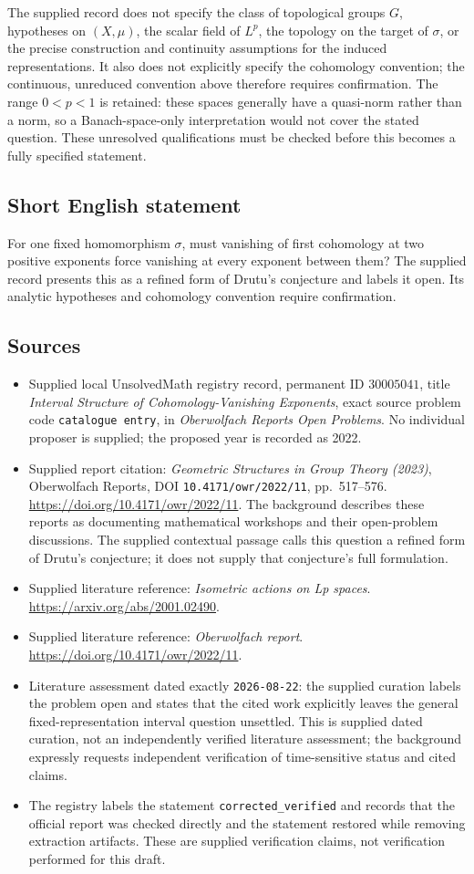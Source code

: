 \documentclass[11pt]{article}
\begin{document}
The supplied record does not specify the class of topological groups \(G\), hypotheses on \((X,\mu)\), the scalar field of \(L^p\), the topology on the target of \(\sigma\), or the precise construction and continuity assumptions for the induced representations. It also does not explicitly specify the cohomology convention; the continuous, unreduced convention above therefore requires confirmation. The range \(0<p<1\) is retained: these spaces generally have a quasi-norm rather than a norm, so a Banach-space-only interpretation would not cover the stated question. These unresolved qualifications must be checked before this becomes a fully specified statement.
\subsection{Short English statement}
For one fixed homomorphism \(\sigma\), must vanishing of first cohomology at two positive exponents force vanishing at every exponent between them? The supplied record presents this as a refined form of Drutu's conjecture and labels it open. Its analytic hypotheses and cohomology convention require confirmation.
\subsection{Sources}
\begin{itemize}
\item Supplied local UnsolvedMath registry record, permanent ID \(30005041\), title \emph{Interval Structure of Cohomology-Vanishing Exponents}, exact source problem code \texttt{catalogue entry}, in \emph{Oberwolfach Reports Open Problems}. No individual proposer is supplied; the proposed year is recorded as 2022.
\item Supplied report citation: \emph{Geometric Structures in Group Theory (2023)}, Oberwolfach Reports, DOI \texttt{10.4171/owr/2022/11}, pp.\ 517--576. \url{https://doi.org/10.4171/owr/2022/11}. The background describes these reports as documenting mathematical workshops and their open-problem discussions. The supplied contextual passage calls this question a refined form of Drutu's conjecture; it does not supply that conjecture's full formulation.
\item Supplied literature reference: \emph{Isometric actions on Lp spaces}. \url{https://arxiv.org/abs/2001.02490}.
\item Supplied literature reference: \emph{Oberwolfach report}. \url{https://doi.org/10.4171/owr/2022/11}.
\item Literature assessment dated exactly \texttt{2026-08-22}: the supplied curation labels the problem open and states that the cited work explicitly leaves the general fixed-representation interval question unsettled. This is supplied dated curation, not an independently verified literature assessment; the background expressly requests independent verification of time-sensitive status and cited claims.
\item The registry labels the statement \texttt{corrected\_verified} and records that the official report was checked directly and the statement restored while removing extraction artifacts. These are supplied verification claims, not verification performed for this draft.
\end{itemize}
\end{document}
